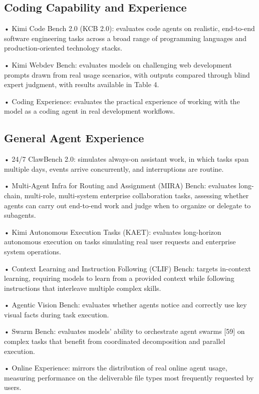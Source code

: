 \documentclass[
  10
]{article}
\begin{document}
\subsection{Coding Capability and
Experience}\label{coding-capability-and-experience}

• Kimi Code Bench 2.0 (KCB 2.0): evaluates code agents on realistic,
end-to-end software engineering tasks across a broad range of
programming languages and production-oriented technology stacks.

• Kimi Webdev Bench: evaluates models on challenging web development
prompts drawn from real usage scenarios, with outputs compared through
blind expert judgment, with results available in Table 4.

• Coding Experience: evaluates the practical experience of working with
the model as a coding agent in real development workflows.

\subsection{General Agent Experience}\label{general-agent-experience}

• 24/7 ClawBench 2.0: simulates always-on assistant work, in which tasks
span multiple days, events arrive concurrently, and interruptions are
routine.

• Multi-Agent Infra for Routing and Assignment (MIRA) Bench: evaluates
long-chain, multi-role, multi-system enterprise collaboration tasks,
assessing whether agents can carry out end-to-end work and judge when to
organize or delegate to subagents.

• Kimi Autonomous Execution Tasks (KAET): evaluates long-horizon
autonomous execution on tasks simulating real user requests and
enterprise system operations.

• Context Learning and Instruction Following (CLIF) Bench: targets
in-context learning, requiring models to learn from a provided context
while following instructions that interleave multiple complex skills.

• Agentic Vision Bench: evaluates whether agents notice and correctly
use key visual facts during task execution.

• Swarm Bench: evaluates models' ability to orchestrate agent swarms
{[}59{]} on complex tasks that benefit from coordinated decomposition
and parallel execution.

• Online Experience: mirrors the distribution of real online agent
usage, measuring performance on the deliverable file types most
frequently requested by users.
\end{document}
